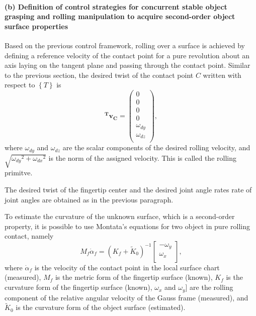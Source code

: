 \paragraph{(b) Definition of control strategies for concurrent stable object grasping and rolling manipulation to acquire second-order object surface properties}

Based on the previous control framework, rolling over a surface is achieved by defining a reference velocity of the contact point for a pure revolution about an axis laying on the tangent plane and passing through the contact point. Similar to the previous section, the desired twist of the contact point $C$ written with respect to $\left\lbrace T \right\rbrace$ is
\begin{equation}
    \bm{^Tv_C}=\left(
    \begin{array}{c}
        0\\
        0\\
        0\\
        0\\
        \omega_{dy}\\
        \omega_{dz}\\
    \end{array}\right),
\end{equation}
where $\omega_{dy}$ and $\omega_{dz}$ are the scalar components of the desired rolling velocity, and $\sqrt{{\omega_{dy}}^2+{\omega_{dx}}^2}$ is the norm of the assigned velocity. This is called the rolling primitve.

The desired twist of the fingertip center and the desired joint angle rates rate of joint angles are obtained as in the previous paragraph.

To estimate the curvature of the unknown surface, which is a second-order property, it is possible to use Montata's equations for two object in pure rolling contact, namely
\begin{equation}
M_f \dot{\alpha}_f=(K_f+\tilde{K}_0)^{-1}
\left[
\begin{array}{c}
-\omega_y\\
\omega_x\\
\end{array}
\right],
\label{eq:montana}
\end{equation}
where $\dot{\alpha}_f$ is the velocity of the contact point in the local surface chart (measured), $M_f$ is the metric form of the fingertip surface (known), $K_f$ is the curvature form of the fingertip surface (known), $\omega_x$ and $\omega_y$] are the rolling component of the relative angular velocity of the Gauss frame (measured), and $\tilde{K}_0$ is the curvature form of the object surface (estimated).

